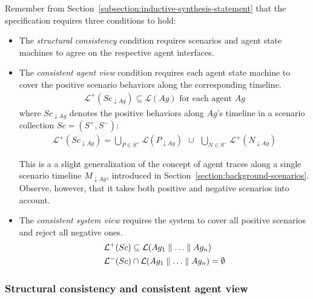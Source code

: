 Remember from Section~\ref{subsection:inductive-synthesis-statement} that the specification requires three conditions to hold: 
\begin{itemize}
\item The \emph{structural consistency} condition requires scenarios and agent state machines to agree on the respective agent interfaces.
\item The \emph{consistent agent view} condition requires each agent state machine to cover the positive scenario behaviors along the corresponding timeline.
\begin{align}
\mathcal{L}^+(Sc_{\downarrow Ag}) \subseteq \mathcal{L}(Ag)\mbox{~for each agent $Ag$}\label{proof:consistent-agent-view}
\end{align}
where $Sc_{\downarrow Ag}$ denotes the positive behaviors along $Ag$'s timeline in a scenario collection $Sc = (S^+, S^-)$:
\begin{align}
\mathcal{L}^+(Sc_{\downarrow Ag}) = \bigcup_{P \in S^+} \mathcal{L}(P_{\downarrow Ag})~~\cup~~\bigcup_{N \in S^{-}} \mathcal{L}^{+}(N_{\downarrow Ag})\label{proof:lemma-sc-projection}
\end{align}

This is a a slight generalization of the concept of agent traces along a single scenario timeline $M_{\downarrow Ag}$, introduced in Section~\ref{section:background-scenarios}. Observe, however, that it takes both positive and negative scenarios into account.
\item The \emph{consistent system view} requires the system to cover all positive scenarios and reject all negative ones. 
\begin{align}
&\mathcal{L}^+(Sc) \subseteq \mathcal{L}(Ag_1 \parallel \ldots \parallel Ag_n)\label{proof:consistent-system-view-1}\\
&\mathcal{L}^-(Sc) \cap      \mathcal{L}(Ag_1 \parallel \ldots \parallel Ag_n) = \emptyset\label{proof:consistent-system-view-2}
\end{align}
\end{itemize}

\subsubsection*{Structural consistency and consistent agent view}


